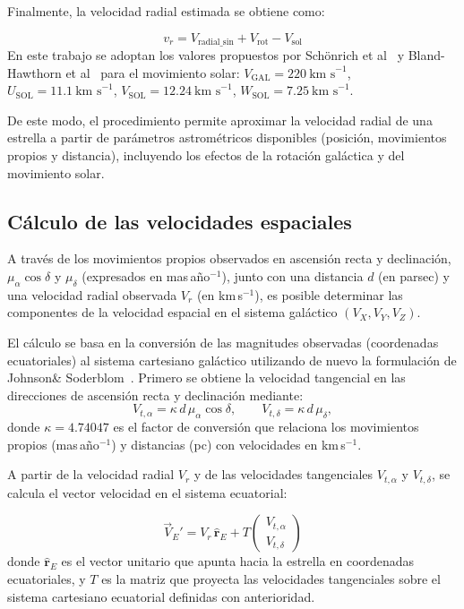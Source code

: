 Finalmente, la velocidad radial estimada se obtiene como:

\[
    v_r = V_{\text{radial\_sin}} + V_{\text{rot}} - V_{\text{sol}}
\]
En este trabajo se adoptan los valores propuestos por Schönrich et al~\cite{schonrich2010} y Bland-Hawthorn et al~\cite{blandhawthorn2016} para el movimiento solar:
\( V_{\text{GAL}} = 220~\text{km s}^{-1} \),  \( U_{\text{SOL}} = 11.1~\text{km s}^{-1}\),  \( V_{\text{SOL}} = 12.24~\text{km s}^{-1}\),  \( W_{\text{SOL}} = 7.25~\text{km s}^{-1}\).

De este modo, el procedimiento permite aproximar la velocidad radial de una estrella a partir de parámetros astrométricos disponibles (posición, movimientos propios y distancia), incluyendo los efectos de la rotación galáctica y del movimiento solar.

\subsection{Cálculo de las velocidades espaciales}\label{subsec:calculo-de-las-velocidades-espaciales}

A través de los movimientos propios observados en ascensión recta y declinación, \(\mu_{\alpha}\cos\delta\) y \(\mu_{\delta}\) (expresados en mas\,año\(^{-1}\)), junto con una distancia \(d\) (en parsec) y una velocidad radial observada \(V_r\) (en km\,s\(^{-1}\)), es posible determinar las componentes de la velocidad espacial en el sistema galáctico \((V_X, V_Y, V_Z)\).

El cálculo se basa en la conversión de las magnitudes observadas (coordenadas ecuatoriales) al sistema cartesiano galáctico utilizando de nuevo la formulación de Johnson\& Soderblom~\cite{johnson1987}.
Primero se obtiene la velocidad tangencial en las direcciones de ascensión recta y declinación mediante:
\[
    V_{t,\alpha} = \kappa \, d \, \mu_{\alpha}\cos\delta,
    \qquad
    V_{t,\delta} = \kappa \, d \, \mu_{\delta},
\]
donde \(\kappa = 4.74047\) es el factor de conversión que relaciona los movimientos propios (mas\,año\(^{-1}\)) y distancias (pc) con velocidades en km\,s\(^{-1}\).

A partir de la velocidad radial \(V_r\) y de las velocidades tangenciales \(V_{t,\alpha}\) y \(V_{t,\delta}\),
se calcula el vector velocidad en el sistema ecuatorial:

\[
    \vec{V}_E' = V_r\,\hat{\mathbf{r}}_E + T
    \begin{pmatrix}
        V_{t,\alpha} \\
        V_{t,\delta}
    \end{pmatrix}
\]
donde \(\hat{\mathbf{r}}_E\) es el vector unitario que apunta hacia la estrella en coordenadas ecuatoriales,
y \(T\) es la matriz que proyecta las velocidades tangenciales sobre el sistema cartesiano ecuatorial definidas con anterioridad.

